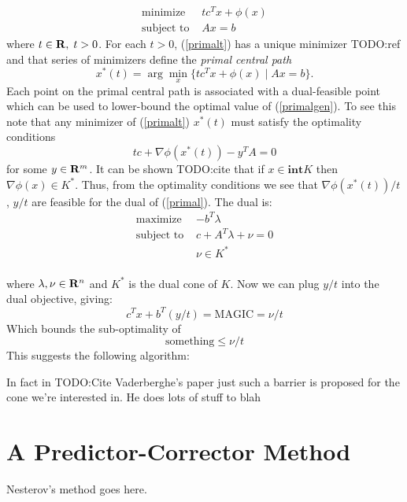 \documentclass{article}
\begin{document}
\begin{equation}\label{primalt}
  \begin{array}{ll}
    \mbox{minimize}    & tc^Tx + \phi(x)\\
    \mbox{subject to } & Ax = b
  \end{array}
\end{equation}
where $t \in \mathbf{R},\;t >0$. For each $t >0$, (\ref{primalt}) has a unique minimizer TODO:ref
and that series of minimizers define the \emph{primal central path}
\[
  x^*(t) = \arg\min_x\{tc^Tx + \phi(x) \mid Ax=b\}.
\]
Each point on the primal central path is associated with a dual-feasible point which
can be used to lower-bound the optimal value of (\ref{primalgen}). To see this note that
any minimizer of (\ref{primalt}) $x^*(t)$ must satisfy the optimality conditions
\[
  tc + \nabla\phi(x^*(t)) - y^TA = 0
\]
for some $y\in\mathbf{R}^m$. It can be shown TODO:cite that if  $x \in \mathbf{int} K$ then
$\nabla\phi(x) \in K^*$. Thus, from the optimality conditions we 
see that $\nabla\phi(x^*(t))/t$, $y/t$ are feasible for the dual of (\ref{primal}). 
The dual is:
\begin{equation}\label{dual}
  \begin{array}{ll}
    \mbox{maximize}    & -b^T\lambda \\
    \mbox{subject to } & c + A^T\lambda + \nu = 0 \\
                       & \nu \in K^* \\
  \end{array}
\end{equation}

where $\lambda, \nu \in \mathbf{R}^n$ and $K^*$ is the dual cone of $K$. Now we can plug 
$y/t$ into the dual objective, giving:
\[
  c^Tx + b^T(y/t) =   \text{MAGIC} = \nu/t
\]
Which bounds the sub-optimality of 
\[
  \text{something} \leq \nu/t 
\]
This suggests the following algorithm:


In fact in TODO:Cite Vaderberghe's paper just such a barrier is proposed for the cone we're
interested in. He does lots of stuff to blah 

\section{A Predictor-Corrector Method}
Nesterov's method goes here.
\end{document}
